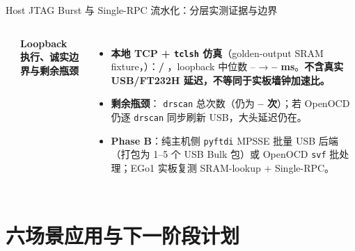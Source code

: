 \documentclass[10pt,aspectratio=169,hyperref={colorlinks,urlcolor=steel,linkcolor=}]{beamer}
\newcommand{\hl}[1]{\textcolor{peking}{\textbf{#1}}}
\begin{document}
\begin{frame}{Host JTAG Burst 与 Single-RPC 流水化：分层实测证据与边界}
\begin{columns}[T,onlytextwidth]
\begin{itemize}
    \end{itemize}
    \textbf{Loopback 执行、诚实边界与剩余瓶颈}
    \begin{itemize}\setlength{\itemsep}{2pt}
      \item \textbf{本地 TCP + \texttt{tclsh} 仿真}（golden-output SRAM fixture，\NRtlWireExactNote）：\hl{\NRpcExactCount/\NRpcModels{}} \NRpcExactStatus，loopback 中位数 \NRpcTcpBatchedMin–\NRpcTcpBatchedMax{} → \hl{\NRpcTcpPipeMin–\NRpcTcpPipeMax{} ms}。\textbf{不含真实 USB/FT232H 延迟，不等同于实板墙钟加速比。}
      \item \textbf{剩余瓶颈}：\NDrscanDeltaNote{} \texttt{drscan} 总次数（仍为 \hl{\NRpcDrscanMin–\NRpcDrscanMax{} 次}）；若 OpenOCD 仍逐 \texttt{drscan} 同步刷新 USB，大头延迟仍在。
      \item \textbf{Phase B}：纯主机侧 \texttt{pyftdi} MPSSE 批量 USB 后端（打包为 1–5 个 USB Bulk 包）或 OpenOCD \texttt{svf} 批处理；EGo1 实板复测 SRAM-lookup + Single-RPC。
    \end{itemize}
  \end{columns}
\end{frame}

\section{六场景应用与下一阶段计划}
\end{document}
